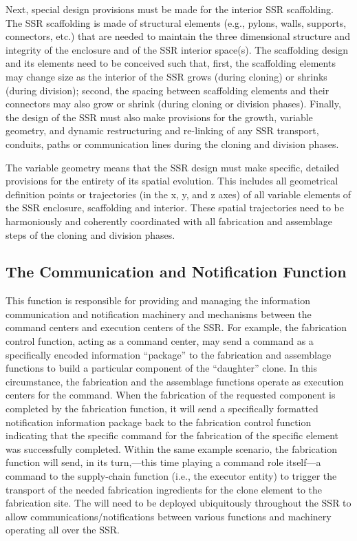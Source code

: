 Next, special design provisions must be made for the interior SSR
scaffolding. The SSR scaffolding is made of structural
elements (e.g., pylons, walls, supports, connectors, etc.) that are needed to
maintain the three dimensional structure and integrity of the enclosure
and of the SSR interior space(s). The scaffolding design and its
elements need to be conceived such that, first, the scaffolding elements may
change size as the
interior of the SSR grows (during cloning) or shrinks (during division);
second, the spacing between scaffolding elements and their connectors may
also grow or shrink (during cloning or division phases).  
Finally, the design of the SSR must also make provisions for the growth,
variable geometry, and dynamic restructuring and re-linking of any SSR
transport, conduits, paths or communication lines during the cloning
and division phases.

The variable geometry means that the SSR design must make specific,
detailed provisions for the entirety of its spatial evolution. This includes all geometrical
definition points or trajectories (in the x, y, and z axes) of all variable
elements of the SSR enclosure, scaffolding and interior. These spatial
trajectories need to be harmoniously and coherently coordinated with
all fabrication and assemblage steps of the cloning and division
phases.

\subsection[The Communication and Notification Function]{The Communication and Notification Function}

This function is responsible for
providing and managing the information communication and notification
machinery and mechanisms between the command centers and execution
centers of the SSR. For example, the fabrication control 
function, acting as a command center, may send a command as a specifically
encoded information “package”  to the fabrication and assemblage
functions to build a particular component of the “daughter” clone. In
this circumstance, the fabrication and the assemblage functions operate
as execution centers for the command. When the fabrication of the
requested component is completed by the fabrication function, it will
send a specifically formatted notification information package back to
the fabrication control function indicating that the specific
command for the fabrication of the specific element was successfully
completed. Within the same example scenario, the fabrication function
will send, in its turn,---this time playing a command role itself---a
command to the supply-chain function (i.e., the executor entity) to trigger
the transport of the needed fabrication ingredients for the clone
element to the fabrication site. The  
will need to be deployed ubiquitously throughout the
SSR to allow communications/notifications between various functions and
machinery operating all over the SSR.

